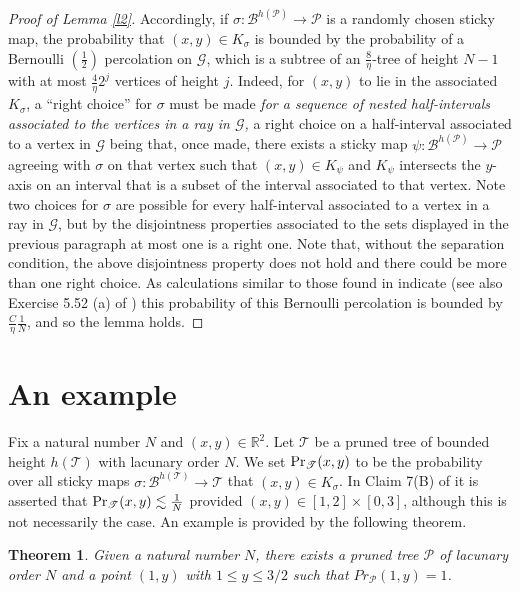 \documentclass[12pt]{amsart}
\numberwithin{equation}{section}
\newtheorem{thm}{Theorem}
\theoremstyle{definition}
\theoremstyle{remark}
\begin{document}
\begin{proof}[Proof of Lemma \ref{l2}]
Accordingly, if  $\sigma: \mathscr{B}^{h(\mathscr{P})} \rightarrow \mathscr{P}$ is a randomly chosen sticky map, the probability that $(x,y) \in K_\sigma$ is bounded by the probability of a Bernoulli $(\frac{1}{2})$ percolation on $\mathscr{G}$, which is a subtree of an $\frac{8}{\eta}$-tree of height $N-1$ with at most  $ \frac{4}{\eta} 2^j$ vertices of height $j$.  Indeed, for $(x,y)$ to lie in the associated $K_\sigma$, a ``right choice'' for $\sigma$ must be made \emph{for a sequence of nested half-intervals associated to the vertices in a ray in $\mathscr{G}$, } a  right choice on a half-interval  associated to  a vertex in $\mathscr{G}$  being that, once made, there exists a sticky map $\psi: \mathscr{B}^{h(\mathscr{P})} \rightarrow \mathscr{P}$ agreeing with $\sigma$ on that vertex such that $(x,y) \in K_\psi$ and $K_\psi$ intersects the $y$-axis on an interval that is a subset of the interval associated to that vertex.   Note two choices for $\sigma$ are possible for every half-interval associated to a vertex in a ray in $\mathscr{G}$, but by the disjointness properties associated to the sets displayed in the previous paragraph at most one is a right one.   Note that, without the separation condition, the above disjointness property does not hold and there could be more than  one right choice.    As calculations similar to those found in \cite{KB, lyons1992} indicate (see also Exercise 5.52 (a) of \cite{lyonsperes}) this probability of this Bernoulli percolation is bounded by $\frac{C}{\eta} \frac{1}{N}$, and so the lemma holds.
\end{proof}

\section{An example}\label{s4}


Fix a natural number $N$ and $(x,y) \in \mathbb{R}^2$.  Let $\mathscr{T}$ be a pruned tree of bounded height $h(\mathscr{T})$ with lacunary order $N$.   We set $\textup{Pr}_\mathscr{T}(x,y)$ to be the probability over all sticky maps $\sigma: \mathscr{B}^{h(\mathscr{T})} \rightarrow \mathscr{T}$ that $(x,y) \in K_\sigma$.   In Claim 7(B) of \cite{Ba} it is asserted that $\textup{Pr}_{\mathscr{T}}(x,y) \lesssim \frac{1}{N}$ provided $(x,y) \in [1,2] \times [0,3]$, although this is not necessarily the case.   An example is provided by the following theorem.

\begin{thm}\label{t2}
Given a natural number $N$, there exists a pruned tree $\mathscr{P}$ of lacunary order $N$ and a point $(1,y)$ with $1 \leq y \leq 3/2$ such that $Pr_\mathscr{P}(1,y) = 1$.
\end{thm}
\end{document}
